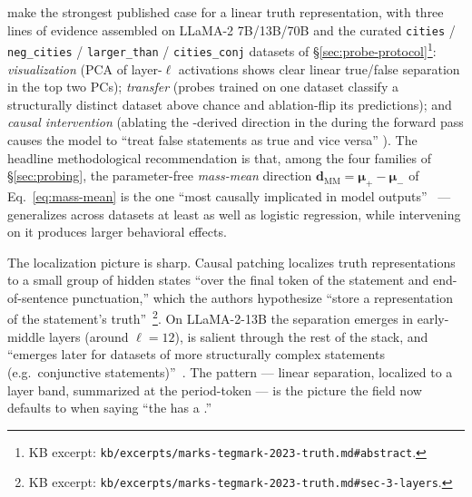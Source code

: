 \citet{marks-tegmark-2023-truth} make the strongest published case for
a linear truth representation, with three lines of evidence assembled
on LLaMA-2 7B/13B/70B and the curated \texttt{cities} /
\texttt{neg\_cities} / \texttt{larger\_than} / \texttt{cities\_conj}
datasets of \S\ref{sec:probe-protocol}\footnote{KB excerpt:
\texttt{kb/excerpts/marks-tegmark-2023-truth.md\#abstract}.}:
\emph{visualization} (PCA of layer-$\ell$ activations shows clear
linear true/false separation in the top two PCs); \emph{transfer}
(probes trained on one dataset classify a structurally distinct
dataset above chance and ablation-flip its predictions); and
\emph{causal intervention} (ablating the -derived direction in
the  during the forward pass causes the model to
``treat false statements as true and vice versa''
\citep[abstract]{marks-tegmark-2023-truth}). The headline
methodological recommendation is that, among the four  families
of \S\ref{sec:probing}, the parameter-free \emph{mass-mean} direction
$\mathbf{d}_\mathrm{MM} = \boldsymbol{\mu}_+ - \boldsymbol{\mu}_-$ of
Eq.~\eqref{eq:mass-mean} is the one ``most causally implicated in
model outputs''~\citep[\S 1]{marks-tegmark-2023-truth} --- generalizes
across datasets at least as well as logistic regression, while
intervening on it produces larger behavioral effects.

The localization picture is sharp. Causal patching localizes truth
representations to a small group of hidden states ``over the final
token of the statement and end-of-sentence punctuation,'' which the
authors hypothesize ``store a representation of the statement's
truth''~\citep[\S 3]{marks-tegmark-2023-truth}\footnote{KB excerpt:
\texttt{kb/excerpts/marks-tegmark-2023-truth.md\#sec-3-layers}.}. On
LLaMA-2-13B the separation emerges in early-middle layers (around
$\ell = 12$), is salient through the rest of the stack, and ``emerges
later for datasets of more structurally complex statements (e.g.\
conjunctive statements)''~\citep[\S 4]{marks-tegmark-2023-truth}. The
pattern --- linear separation, localized to a layer band, summarized
at the period-token --- is the picture the field now defaults to when
saying ``the \glsterm{llm}{LLM} has a .''

